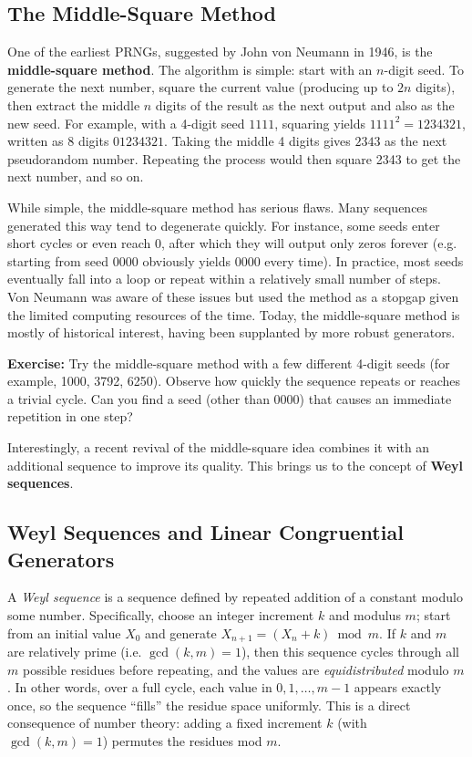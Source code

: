 \documentclass[11pt]{article}
\begin{document}
\subsection{The Middle-Square Method}
One of the earliest PRNGs, suggested by John von Neumann in 1946, is the \textbf{middle-square method}. The algorithm is simple: start with an $n$-digit seed. To generate the next number, square the current value (producing up to $2n$ digits), then extract the middle $n$ digits of the result as the next output and also as the new seed. For example, with a 4-digit seed $1111$, squaring yields $1111^2 = 1234321$, written as 8 digits $01234321$. Taking the middle 4 digits gives $2343$ as the next pseudorandom number. Repeating the process would then square 2343 to get the next number, and so on.

While simple, the middle-square method has serious flaws. Many sequences generated this way tend to degenerate quickly. For instance, some seeds enter short cycles or even reach 0, after which they will output only zeros forever (e.g. starting from seed 0000 obviously yields 0000 every time). In practice, most seeds eventually fall into a loop or repeat within a relatively small number of steps. Von Neumann was aware of these issues but used the method as a stopgap given the limited computing resources of the time. Today, the middle-square method is mostly of historical interest, having been supplanted by more robust generators.

\textbf{Exercise:} Try the middle-square method with a few different 4-digit seeds (for example, 1000, 3792, 6250). Observe how quickly the sequence repeats or reaches a trivial cycle. Can you find a seed (other than 0000) that causes an immediate repetition in one step?

Interestingly, a recent revival of the middle-square idea combines it with an additional sequence to improve its quality. This brings us to the concept of \textbf{Weyl sequences}.

\subsection{Weyl Sequences and Linear Congruential Generators}
A \emph{Weyl sequence} is a sequence defined by repeated addition of a constant modulo some number. Specifically, choose an integer increment $k$ and modulus $m$; start from an initial value $X_0$ and generate $X_{n+1} = (X_n + k) \bmod m$. If $k$ and $m$ are relatively prime (i.e. $\gcd(k,m)=1$), then this sequence cycles through all $m$ possible residues before repeating, and the values are \emph{equidistributed} modulo $m$. In other words, over a full cycle, each value in $0,1,\ldots,m-1$ appears exactly once, so the sequence “fills” the residue space uniformly. This is a direct consequence of number theory: adding a fixed increment $k$ (with $\gcd(k,m)=1$) permutes the residues mod $m$.
\end{document}
